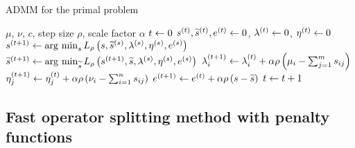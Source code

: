 \documentclass[english]{pkupaper}
\begin{document}
\begin{algorithm}
\caption{ADMM for the primal problem}
\label{Alg:ADMMPrimal}
\begin{algorithmic}
\REQUIRE $\mu$, $\nu$, $c$, step size $\rho$, scale factor $\alpha$
\STATE $ t \leftarrow 0 $
\STATE $ s^{\left( t \right)}, \widetilde{s}^{\left( t \right)}, e^{\left( t \right)} \leftarrow 0 $, $ \lambda^{\left( t \right)} \leftarrow 0 $, $ \eta^{\left( t \right)} \leftarrow 0 $
\STATE $ s^{\left(  t + 1  \right)} \leftarrow \operatorname*{\arg\,\min}_s L_{\rho} \left(  s, \widetilde{s}^{\left( s \right)}, \lambda^{\left( s \right)}, \eta^{\left( s \right)}, e^{\left( s \right)}  \right) $
\STATE $ \widetilde{s}^{\left(  t + 1  \right)} \leftarrow \operatorname*{\arg\,\min}_{\widetilde{s}} L_{\rho} \left(  s^{\left(  t + 1  \right)}, \widetilde{s}, \lambda^{\left( s \right)}, \eta^{\left( s \right)}, e^{\left( s \right)}  \right) $
\STATE $ \lambda^{\left(  t + 1  \right)}_i \leftarrow \lambda^{\left( t \right)}_i + \alpha \rho \left(  \mu_i - \sum_{ {j} = {1} }^{m}{s_{ i j }}  \right) $
\STATE $ \eta^{\left(  t + 1  \right)}_j \leftarrow \eta^{\left( t \right)}_j + \alpha \rho \left(  \nu_i - \sum_{ {i} = {1} }^{n}{s_{ i j }}  \right) $
\STATE $ e^{\left(  t + 1  \right)} \leftarrow e^{\left( t \right)} + \alpha \rho \left(  s - \widetilde{s}  \right) $
\STATE $ t \leftarrow t + 1 $
\ENDWHILE
\end{algorithmic}
\end{algorithm}

\subsection{Fast operator splitting method with penalty functions}
\end{document}
